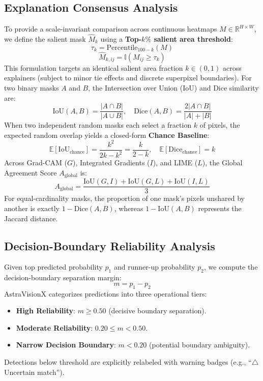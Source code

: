 \documentclass[journal,10pt,twocolumn]{IEEEtran}
\begin{document}
\subsection{Explanation Consensus Analysis}
To provide a scale-invariant comparison across continuous heatmaps $M \in \mathbb{R}^{H \times W}$, we define the salient mask $\hat{M}_k$ using a \textbf{Top-$k\%$ salient area threshold}:
\begin{equation}
\tau_k = \text{Percentile}_{100-k}(M)
\end{equation}
\begin{equation}
\hat{M}_{k, ij} = \mathbb{I}(M_{ij} \ge \tau_k)
\end{equation}
This formulation targets an identical salient area fraction $k \in (0, 1)$ across explainers (subject to minor tie effects and discrete superpixel boundaries). For two binary masks $A$ and $B$, the Intersection over Union (IoU) and Dice similarity are:
\begin{equation}
\text{IoU}(A, B) = \frac{|A \cap B|}{|A \cup B|}, \quad \text{Dice}(A, B) = \frac{2|A \cap B|}{|A| + |B|}
\end{equation}
When two independent random masks each select a fraction $k$ of pixels, the expected random overlap yields a closed-form \textbf{Chance Baseline}:
\begin{equation}
\mathbb{E}[\text{IoU}_{\text{chance}}] = \frac{k^2}{2k - k^2} = \frac{k}{2 - k}, \quad \mathbb{E}[\text{Dice}_{\text{chance}}] = k
\end{equation}
Across Grad-CAM ($G$), Integrated Gradients ($I$), and LIME ($L$), the Global Agreement Score $A_{\text{global}}$ is:
\begin{equation}
A_{\text{global}} = \frac{\text{IoU}(G, I) + \text{IoU}(G, L) + \text{IoU}(I, L)}{3}
\end{equation}
For equal-cardinality masks, the proportion of one mask's pixels unshared by another is exactly $1 - \text{Dice}(A, B)$, whereas $1 - \text{IoU}(A, B)$ represents the Jaccard distance.

\subsection{Decision-Boundary Reliability Analysis}
Given top predicted probability $p_1$ and runner-up probability $p_2$, we compute the decision-boundary separation margin:
\begin{equation}
m = p_1 - p_2
\end{equation}
AstraVisionX categorizes predictions into three operational tiers:
\begin{itemize}
    \item \textbf{High Reliability}: $m \ge 0.50$ (decisive boundary separation).
    \item \textbf{Moderate Reliability}: $0.20 \le m < 0.50$.
    \item \textbf{Narrow Decision Boundary}: $m < 0.20$ (potential boundary ambiguity).
\end{itemize}
Detections below threshold are explicitly relabeled with warning badges (e.g., ``$\triangle$ Uncertain match'').
\end{document}
